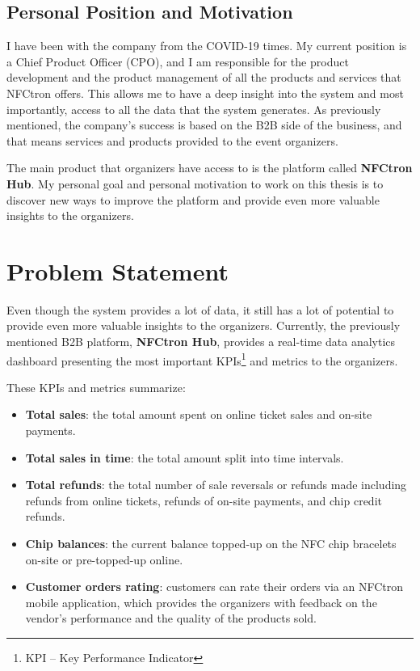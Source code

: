 \subsection*{Personal Position and Motivation}
\label{subsec:introduction-background-motivation}
I have been with the company from the COVID-19 times.
My current position is a Chief Product Officer (CPO), and I am responsible for the product development and the product management of all the products and services that NFCtron offers.
This allows me to have a deep insight into the system and most importantly, access to all the data that the system generates.
As previously mentioned, the company's success is based on the B2B side of the business, and that means services and products provided to the event organizers.

The main product that organizers have access to is the platform called \textbf{NFCtron Hub}.
My personal goal and personal motivation to work on this thesis is to discover new ways to improve the platform and provide even more valuable insights to the organizers.

\section*{Problem Statement}
\label{sec:introduction-problem-statement}
Even though the system provides a lot of data, it still has a lot of potential to provide even more valuable insights to the organizers.
Currently, the previously mentioned B2B platform, \textbf{NFCtron Hub}, provides a real-time data analytics dashboard presenting the most important KPIs\footnote{KPI – Key Performance Indicator} and metrics to the organizers.

These KPIs and metrics summarize:
\begin{itemize}
	\item \textbf{Total sales}: the total amount spent on online ticket sales and on-site payments.
	\item \textbf{Total sales in time}: the total amount split into time intervals.
	\item \textbf{Total refunds}: the total number of sale reversals or refunds made including refunds from online tickets, refunds of on-site payments, and chip credit refunds.
	\item \textbf{Chip balances}: the current balance topped-up on the NFC chip bracelets on-site or pre-topped-up online.
	\item \textbf{Customer orders rating}: customers can rate their orders via an NFCtron mobile application, which provides the organizers with feedback on the vendor's performance and the quality of the products sold.
\end{itemize}

